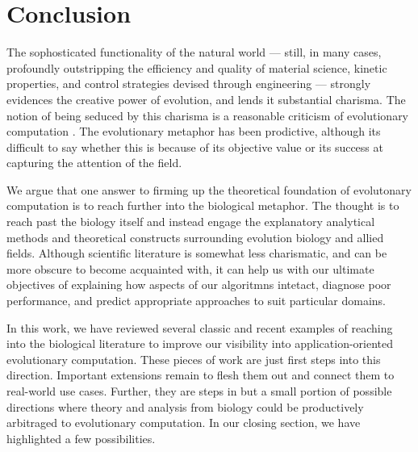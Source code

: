 
\section{Conclusion} \label{sec:conclusion}

The sophosticated functionality of the natural world --- still, in many cases, profoundly outstripping the efficiency and quality of material science, kinetic properties, and control strategies devised through engineering --- strongly evidences the creative power of evolution, and lends it substantial charisma.
The notion of being seduced by this charisma is a reasonable criticism of evolutionary computation \citep{moore2023evolution,woodward2009evolution}.
The evolutionary metaphor has been prodictive, although its difficult to say whether this is because of its objective value or its success at capturing the attention of the field.

We argue that one answer to firming up the theoretical foundation of evolutonary computation is to reach further into the biological metaphor. The thought is to reach past the biology itself and instead engage  the explanatory analytical methods and theoretical constructs surrounding  evolution biology and allied fields.
Although scientific literature is somewhat less charismatic, and can be more obscure to become acquainted with, it can help us with our ultimate objectives of explaining how aspects of our algoritmns intetact, diagnose poor performance, and predict appropriate approaches to suit particular domains.

In this work, we have reviewed several classic and recent examples of reaching into the biological literature to improve our visibility into application-oriented evolutionary computation.
These pieces of work are just first steps into this direction.
Important extensions remain to flesh them out and connect them to real-world use cases.
Further, they are steps in but a small portion of possible directions where theory and analysis from biology could be productively arbitraged to evolutionary computation.
In our closing section, we have highlighted a few possibilities.


